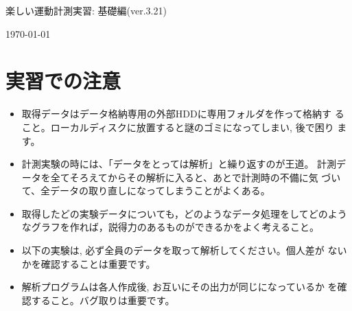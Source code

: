\documentclass{jsarticle}
\def\version{3.21}
\begin{document}
\begin{center}
  {\LARGE 楽しい運動計測実習: 基礎編(ver.\version)}
\end{center}
\begin{flushright}
\today
\end{flushright}

\section*{実習での注意}
\begin{itemize}
\item 取得データはデータ格納専用の外部HDDに専用フォルダを作って格納す
  ること。ローカルディスクに放置すると謎のゴミになってしまい, 後で困り
  ます。
\item 計測実験の時には、「データをとっては解析」と繰り返すのが王道。
  計測データを全てそろえてからその解析に入ると、あとで計測時の不備に気
  づいて、全データの取り直しになってしまうことがよくある。
\item 取得したどの実験データについても，どのようなデータ処理をしてどのようなグラフを作れば，説得力のあるものができるかをよく考えること。
\item 以下の実験は, 必ず全員のデータを取って解析してください。個人差が
  ないかを確認することは重要です。
\item 解析プログラムは各人作成後, お互いにその出力が同じになっているか
  を確認すること。バグ取りは重要です。
\end{itemize}

\end{document}
